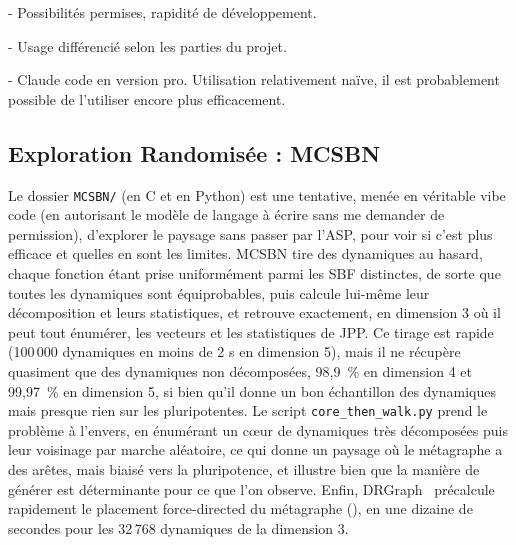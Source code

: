 \documentclass[12pt, a4paper]{article}
\begin{document}
- Possibilités permises, rapidité de développement.

- Usage différencié selon les parties du projet.

- Claude code en version pro. Utilisation relativement naïve, il est probablement possible de l'utiliser encore plus efficacement.

\subsection{Exploration Randomisée : MCSBN}
\label{sec:mcsbn}

Le dossier \texttt{MCSBN/} (en C et en Python) est une tentative, menée en véritable vibe code (en autorisant le modèle de langage à écrire sans me demander de permission), d'explorer le paysage sans passer par l'ASP, pour voir si c'est plus efficace et quelles en sont les limites.
MCSBN tire des dynamiques au hasard, chaque fonction étant prise uniformément parmi les SBF distinctes, de sorte que toutes les dynamiques sont équiprobables, puis calcule lui-même leur décomposition et leurs statistiques, et retrouve exactement, en dimension 3 où il peut tout énumérer, les vecteurs et les statistiques de JPP.
Ce tirage est rapide (100\,000 dynamiques en moins de 2 s en dimension 5), mais il ne récupère quasiment que des dynamiques non décomposées, 98,9~\% en dimension 4 et 99,97~\% en dimension 5, si bien qu'il donne un bon échantillon des dynamiques mais presque rien sur les pluripotentes.
Le script \texttt{core\_then\_walk.py} prend le problème à l'envers, en énumérant un cœur de dynamiques très décomposées puis leur voisinage par marche aléatoire, ce qui donne un paysage où le métagraphe a des arêtes, mais biaisé vers la pluripotence, et illustre bien que la manière de générer est déterminante pour ce que l'on observe.
Enfin, DRGraph~\cite{zhu2020} précalcule rapidement le placement force-directed du métagraphe (), en une dizaine de secondes pour les 32\,768 dynamiques de la dimension 3.
\end{document}
